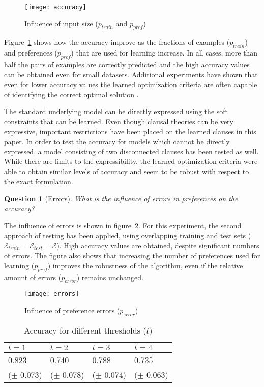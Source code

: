 \documentclass[letterpaper]{article}
\newcommand{\sym}[1]{\ensuremath{\mathcal{#1}}}
\newtheorem{question}{Question}
\theoremstyle{definition}
\begin{document}
\begin{figure}
  \centering
    \texttt{[image: accuracy]}
  \caption{Influence of input size ($p_{train}$ and $p_{pref}$)}
  \label{fig:fractie}
\end{figure}

Figure~\ref{fig:fractie} shows how the accuracy improve as the fractions of examples ($p_{train}$) and preferences ($p_{pref}$) that are used for learning increase.
In all cases, more than half the pairs of examples are correctly predicted and the high accuracy values can be obtained even for small datasets.
Additional experiments have shown that even for lower accuracy values the learned optimization criteria are often capable of identifying the correct optimal solution \cite{kolb2015thesis}.

The standard underlying model can be directly expressed using the soft constraints that can be learned.
Even though clausal theories can be very expressive, important restrictions have been placed on the learned clauses in this paper.
In order to test the accuracy for models which cannot be directly expressed, a model consisting of two disconnected clauses has been tested as well.
While there are limits to the expressibility, the learned optimization criteria were able to obtain similar levels of accuracy and seem to be robust with respect to the exact formulation.

\begin{question}[Errors]
  What is the influence of errors in preferences on the accuracy?
\end{question}

The influence of errors is shown in figure~\ref{fig:ruis}.
For this experiment, the second approach of testing has been applied, using overlapping training and test sets ($\sym{E}_{train} = \sym{E}_{test} = \sym{E}$).
High accuracy values are obtained, despite significant numbers of errors.
The figure also shows that increasing the number of preferences used for learning ($p_{pref}$) improves the robustness of the algorithm, even if the relative amount of errors ($p_{error}$) remains unchanged.

\begin{figure}
  \centering
    \texttt{[image: errors]}
  \caption{Influence of preference errors ($p_{error}$)}
  \label{fig:ruis}
\end{figure}

  \begin{table}[!htp]
    \caption{Accuracy for different thresholds ($t$)}
    \begin{tabularx}{\linewidth}{XXXX}
      $t = 1$ & $t = 2$ & $t = 3$ & $t = 4$ \\
      \toprule
     0.823 & 0.740 & 0.788 & 0.735 \\
     ($\pm$ 0.073)&
($\pm$ 0.078)&
($\pm$ 0.074)&
($\pm$ 0.063)
    \end{tabularx}
    \label{tbl:limiet}
  \end{table}
\end{document}

